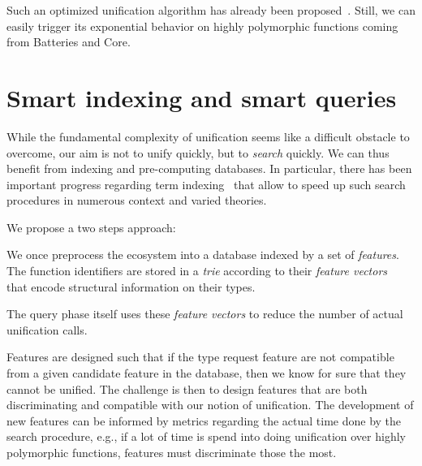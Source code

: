 \documentclass [a4paper,11pt]{scrartcl}
\begin{document}
Such an optimized unification algorithm has already been proposed~\cite {boudet}. Still, we can easily trigger its exponential behavior on highly polymorphic functions coming from Batteries and Core.




\section{Smart indexing and smart queries}

While the fundamental complexity of unification seems like a difficult
obstacle to overcome, our aim is not to unify quickly, but to \emph{search}
quickly. We can thus benefit from indexing and pre-computing databases.
In particular, there has been important progress regarding
term indexing~\cite{schulz,DBLP:books/el/RV01/RamakrishnanSV01} that allow
to speed up such search procedures in numerous context and varied theories.


We propose a two steps approach:
\begin{compactitem}
\item We once preprocess the ecosystem into a database indexed by a set of \emph{features}. The function identifiers are stored in a \textit{trie} according to their \textit{feature vectors}~\cite{schulz} that encode structural information on their types.
\item The query phase itself uses these \emph{feature vectors} to reduce the number of actual unification calls.
\end{compactitem}
Features are designed such that if the type request feature are not compatible
from a given candidate feature in the database, then we know for sure that they cannot be unified.  The challenge is then to design features that are both discriminating and compatible with  our notion of unification. 
The development of new features can be informed by metrics regarding the actual
time done by the search procedure, e.g., if a lot of time is spend
into doing unification over highly polymorphic functions, features
must discriminate those the most.
\end{document}
